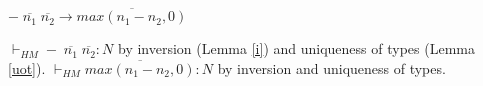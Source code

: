 \begin{case}
$-\;\overline{n_{1}}\;\overline{n_{2}}\rightarrow\overline{max(n_{1}-n_{2},0)}$

$\vdash_{HM}-\;\overline{n_{1}}\;\overline{n_{2}}:N$ by inversion (Lemma \ref{i}) and uniqueness of types (Lemma \ref{uot}).  $\vdash_{HM}\overline{max(n_{1}-n_{2},0)}:N$ by inversion and uniqueness of types.
\end{case}